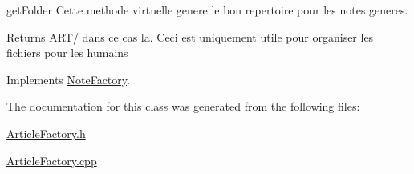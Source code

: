 get\-Folder Cette methode virtuelle genere le bon repertoire pour les notes generes. 

\begin{DoxyReturn}{Returns}
A\-R\-T/ dans ce cas la. Ceci est uniquement utile pour organiser les fichiers pour les humains 
\end{DoxyReturn}


Implements \hyperlink{class_note_factory_a9d4c924038af855a7c4a51455b13ab83}{Note\-Factory}.



The documentation for this class was generated from the following files\-:\begin{DoxyCompactItemize}
\item 
\hyperlink{_article_factory_8h}{Article\-Factory.\-h}\item 
\hyperlink{_article_factory_8cpp}{Article\-Factory.\-cpp}\end{DoxyCompactItemize}
